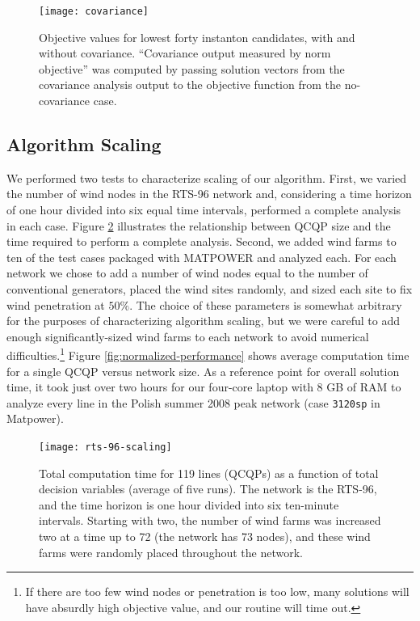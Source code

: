 \documentclass[journal,twoside]{IEEEtran}
\begin{document}
\begin{figure}
\centering
\texttt{[image: covariance]}
\caption{Objective values for lowest forty instanton candidates, with and without covariance. ``Covariance output measured by norm objective'' was computed by passing solution vectors from the covariance analysis output to the objective function from the no-covariance case.}
\label{fig:covariance}
\end{figure}

\subsection{Algorithm Scaling}
We performed two tests to characterize scaling of our algorithm. First, we varied the number of wind nodes in the RTS-96 network and, considering a time horizon of one hour divided into six equal time intervals, performed a complete analysis in each case. Figure \ref{fig:rts-96-scaling} illustrates the relationship between QCQP size and the time required to perform a complete analysis. Second, we added wind farms to ten of the test cases packaged with MATPOWER \cite{zimmerman2011} and analyzed each. For each network we chose to add a number of wind nodes equal to the number of conventional generators, placed the wind sites randomly, and sized each site to fix wind penetration at $50\%$. The choice of these parameters is somewhat arbitrary for the purposes of characterizing algorithm scaling, but we were careful to add enough significantly-sized wind farms to each network to avoid numerical difficulties.\footnote{If there are too few wind nodes or penetration is too low, many solutions will have absurdly high objective value, and our routine will time out.} Figure \ref{fig:normalized-performance} shows average computation time for a single QCQP versus network size. As a reference point for overall solution time, it took just over two hours for our four-core laptop with 8 GB of RAM to analyze every line in the Polish summer 2008 peak network (case \texttt{3120sp} in Matpower).

\begin{figure}
\centering
\texttt{[image: rts-96-scaling]}
\caption{Total computation time for 119 lines (QCQPs) as a function of total decision variables (average of five runs). The network is the RTS-96, and the time horizon is one hour divided into six ten-minute intervals. Starting with two, the number of wind farms was increased two at a time up to 72 (the network has 73 nodes), and these wind farms were randomly placed throughout the network.}
\label{fig:rts-96-scaling}
\end{figure}
\end{document}
